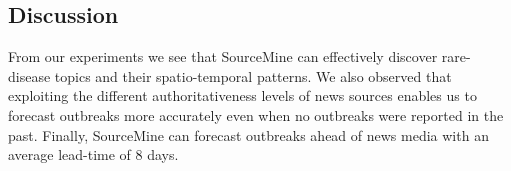 \documentclass[conference]{IEEEtran}
\newcommand{\fullmodel}{{{\sf SourceMine}}\xspace}
\begin{document}
\subsection{Discussion}
From our experiments we see that \fullmodel can effectively discover rare-disease topics and their spatio-temporal patterns. We also observed that exploiting the different authoritativeness levels of news sources enables us to forecast outbreaks more accurately even when no outbreaks were reported in the past. Finally, \fullmodel can forecast outbreaks ahead of news media with an average lead-time of 8 days.

%


%
\end{document}
